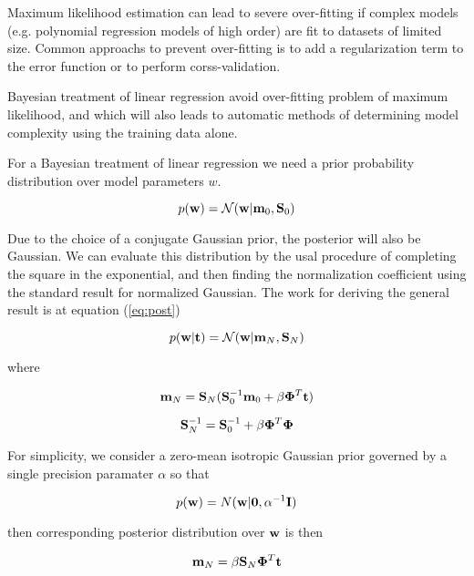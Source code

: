 
Maximum likelihood estimation can lead to severe over-fitting if complex models (e.g. polynomial regression models of high order) are fit to datasets of limited size.
Common approachs to prevent over-fitting is to add a regularization term to the error function or to perform corss-validation.

\begin{framed}
Bayesian treatment of linear regression avoid over-fitting problem of maximum likelihood, and which will also leads to automatic methods of determining model complexity using the training data alone.
\end{framed}

For a Bayesian treatment of linear regression we need a prior probability distribution over model parameters $w$.

\begin{equation}
 p(\mathbf{w}) = \mathcal{N}(\mathbf{w}|\mathbf{m}_0, \mathbf{S}_0)
\end{equation}

Due to the choice of a conjugate Gaussian prior, the posterior will also be Gaussian.
We can evaluate this distribution by the usal procedure of completing the square in the exponential, and then finding the normalization coefficient using the standard result for normalized Gaussian.
The work for deriving the general result is at equation (\ref{eq:post})

\begin{equation}
 p(\mathbf{w}|\mathbf{t}) = \mathcal{N}(\mathbf{w}|\mathbf{m}_N, \mathbf{S}_N)
\end{equation}

where 

\begin{equation}
 \mathbf{m}_N = \mathbf{S}_N (\mathbf{S}_0^{-1} \mathbf{m}_0 + \beta \mathbf{\Phi}^T \mathbf{t})
\end{equation}

\begin{equation}
 \mathbf{S}_N^{-1} = \mathbf{S}_0^{-1} + \beta \mathbf{\Phi}^T\mathbf{\Phi}
\end{equation}

For simplicity, we consider a zero-mean isotropic Gaussian prior governed by a single precision paramater $\alpha$ so that

\begin{equation}
 p(\mathbf{w}) = N(\mathbf{w}|\mathbf{0}, \alpha^{-1} \mathbf{I})
\end{equation}

then corresponding posterior distribution over $\mathbf{w}$ is then 


\begin{equation}
 \mathbf{m}_N = \beta  \mathbf{S}_N\mathbf{\Phi}^T \mathbf{t}
\end{equation}

